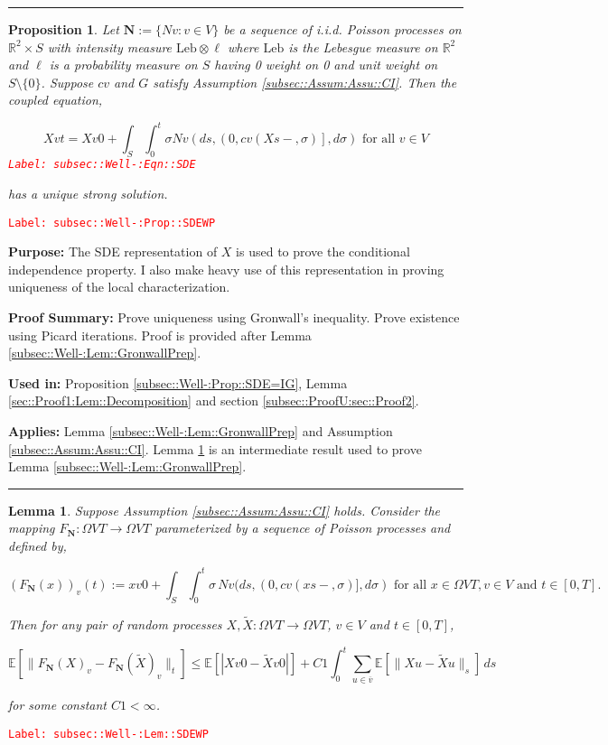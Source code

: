 \documentclass[12pt]{article}
\newcommand{\mb}{\mathbb}
\newcommand{\ra}{\rightarrow}
\newcommand{\ov}{\overline}
\newcommand{\te}{\text}
\newcommand{\tr}{\textcolor{red}}
\newcommand{\labe}[1]{\tr{\texttt{Label: #1}}}
\newcommand{\purpose}{\textbf{Purpose: }}
\newcommand{\pfsum}{\textbf{Proof Summary: }}
\newcommand{\usein}{\textbf{Used in: }}
\newcommand{\app}{\textbf{Applies: }}
\newcommand{\lin}{\rule{\linewidth}{0.4 pt}}
\newcommand{\ex}[1]{\mb{E}\left[#1\right]}			%
\newcommand{\defeq}{:=}								%
\renewcommand{\v}{v}							%
\newcommand{\vv}{u}								%
\renewcommand{\S}{S}							%
\newcommand{\s}{\sigma}							%
\newcommand{\T}{T}								%
\newcommand{\x}{x}								%
\renewcommand{\t}{t}							%
\renewcommand{\tt}{s}							%
\newcommand{\X}{X}								%
\newcommand{\IGr}{c}							%
\newcommand{\cl}{\ov}							%
\newcommand{\ve}[1]{_{#1}}						%
\newcommand{\tp}[1]{(#1)}						%
\newcommand{\const}{C}							%
\newcommand{\poisses}{\mathbf{N}}				%
\newcommand{\poiss}{N}							%
\newcommand{\leb}{\te{Leb}}						%
\newcommand{\Sm}{\ell}							%
\newcommand{\Fpo}{F_{\poisses}}					%
\newcommand{\alt}[1]{\widetilde{#1}}			%
\newtheorem{prop}[thms]{Proposition}
\newtheorem{lem}[thms]{Lemma}
\begin{document}
\lin

\begin{prop}
Let \(\poisses \defeq \{\poiss{\v}:\v\in  V\}\) be a sequence of i.i.d. Poisson processes on \(\mb{R}^2\times \S\) with intensity measure \(\leb\otimes \Sm\) where \(\leb\) is the Lebesgue measure on \(\mb{R}^2\) and \(\Sm\) is a probability measure on \(\S\) having 0 weight on 0 and unit weight on \(\S\setminus \{0\}\). Suppose \(\IGr{\v}\) and \(G\) satisfy Assumption \ref{subsec::Assum:Assu::CI}. Then the coupled equation,

\begin{equation}
\X{\v}{\t} = \X{\v}{0} + \int_\S\int_0^\t \s\poiss{\v}\left(d\tt,\left(0,\IGr{\v}(\X{}{\tt-},\s)\right],d\s\right) \te{ for all }\v \in  V
\label{subsec::Well-:Eqn::SDE}
\end{equation}
\labe{subsec::Well-:Eqn::SDE}

has a unique strong solution.
\label{subsec::Well-:Prop::SDEWP}
\end{prop}
\labe{subsec::Well-:Prop::SDEWP}

\purpose The SDE representation of \(\X{}{}\) is used to prove the conditional independence property. I also make heavy use of this representation in proving uniqueness of the local characterization.

\pfsum Prove uniqueness using Gronwall's inequality. Prove existence using Picard iterations. Proof is provided after Lemma \ref{subsec::Well-:Lem::GronwallPrep}.

\usein Proposition \ref{subsec::Well-:Prop::SDE=IG}, Lemma \ref{sec::Proof1:Lem::Decomposition} and section \ref{subsec::ProofU:sec::Proof2}.

\app Lemma \ref{subsec::Well-:Lem::GronwallPrep} and Assumption \ref{subsec::Assum:Assu::CI}. Lemma \ref{subsec::Well-:Lem::SDEWP} is an intermediate result used to prove Lemma \ref{subsec::Well-:Lem::GronwallPrep}.

\lin

\begin{lem}
Suppose Assumption \ref{subsec::Assum:Assu::CI} holds. Consider the mapping \(\Fpo: \Omega{ V}{\T} \ra \Omega{ V}{\T}\) parameterized by a sequence of Poisson processes and defined by,

\[\left(\Fpo(\x{}{})\right)\ve{\v}\tp{\t} := \x{\v}{0} + \int_\S\int_0^\t \s \,\poiss{\v}(d\tt,(0,\IGr{\v}(\x{}{\tt-},\s)],d\s) \te{ for all }\x{}{} \in \Omega{ V}{\T}, \v \in  V\te{ and }\t \in [0,\T].\]

Then for any pair of random processes \(\X{}{},\alt{\X}{{}{}}:\Omega{ V}{\T} \ra \Omega{ V}{\T}\), \(\v\in  V\) and \(\t \in [0,\T]\),

\[\ex{\|\Fpo(\X{}{})_\v - \Fpo(\alt{\X}{}{})_\v\|_\t} \leq \ex{|\X{\v}{0} - \alt{\X}{\v}{0}|} +  \const{1}\int_0^\t \sum_{\vv\in \cl{\v}} \ex{\|\X{\vv}{} - \alt{\X}{\vv}{}\|_\tt}\,d\tt\]

for some constant \(\const{1} < \infty\).

\label{subsec::Well-:Lem::SDEWP}
\end{lem}
\labe{subsec::Well-:Lem::SDEWP}
\end{document}
